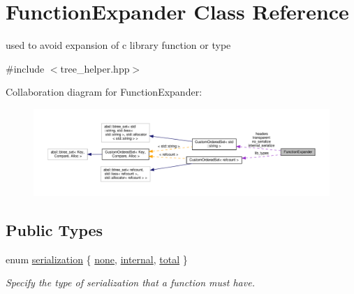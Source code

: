 \hypertarget{classFunctionExpander}{}\section{Function\+Expander Class Reference}
\label{classFunctionExpander}


used to avoid expansion of c library function or type  




{\ttfamily \#include $<$tree\+\_\+helper.\+hpp$>$}



Collaboration diagram for Function\+Expander\+:
\nopagebreak
\begin{figure}[H]
\begin{center}
\leavevmode
\includegraphics[width=350pt]{d3/da9/classFunctionExpander__coll__graph}
\end{center}
\end{figure}
\subsection*{Public Types}
\begin{DoxyCompactItemize}
\item 
enum \hyperlink{classFunctionExpander_a2b421dee6238b8f68b6ab29b87bc00d0}{serialization} \{ \hyperlink{classFunctionExpander_a2b421dee6238b8f68b6ab29b87bc00d0afd63bae2d2d72c77193793386a179e0b}{none}, 
\hyperlink{classFunctionExpander_a2b421dee6238b8f68b6ab29b87bc00d0a5c84c616abd1543486ecc1654b0cd73e}{internal}, 
\hyperlink{classFunctionExpander_a2b421dee6238b8f68b6ab29b87bc00d0ab4a76bc596cbb53a26e52a2bb6e7e1ab}{total}
 \}\begin{DoxyCompactList}\small\item\em Specify the type of serialization that a function must have. \end{DoxyCompactList}
\end{DoxyCompactItemize}
